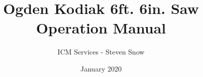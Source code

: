 \documentclass[a4paper,12pt]{book}
\begin{document}
\author{ICM Services - Steven Snow}
\title{Ogden Kodiak 6ft. 6in. Saw Operation Manual}
\date{January 2020}

\frontmatter
\maketitle
\tableofcontents
\listoffigures


\mainmatter






\backmatter
\printindex
\end{document}
